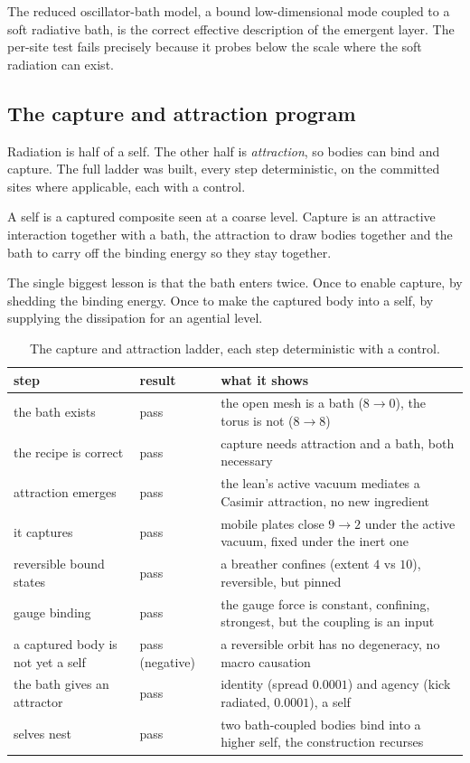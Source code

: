 The reduced oscillator-bath model, a bound low-dimensional mode coupled to a soft radiative bath, is the correct
effective description of the emergent layer. The per-site test fails precisely because it probes below the scale
where the soft radiation can exist.

\subsection{The capture and attraction program}

Radiation is half of a self. The other half is \emph{attraction}, so bodies can bind and capture. The full ladder
was built, every step deterministic, on the committed sites where applicable, each with a control.

\begin{definition}[Capture]
A self is a captured composite seen at a coarse level. Capture is an attractive interaction together with a bath,
the attraction to draw bodies together and the bath to carry off the binding energy so they stay together.
\end{definition}

The single biggest lesson is that the bath enters twice. Once to enable capture, by shedding the binding energy.
Once to make the captured body into a self, by supplying the dissipation for an agential level.

\begin{table}[ht]
\centering
\begin{tabular}{@{}llp{}@{}}
\toprule
step & result & what it shows \\
\midrule
the bath exists & pass & the open mesh is a bath ($8 \to 0$), the torus is not ($8 \to 8$) \\
the recipe is correct & pass & capture needs attraction and a bath, both necessary \\
attraction emerges & pass & the lean's active vacuum mediates a Casimir attraction, no new ingredient \\
it captures & pass & mobile plates close $9 \to 2$ under the active vacuum, fixed under the inert one \\
reversible bound states & pass & a breather confines (extent $4$ vs $10$), reversible, but pinned \\
gauge binding & pass & the gauge force is constant, confining, strongest, but the coupling is an input \\
a captured body is not yet a self & pass (negative) & a reversible orbit has no degeneracy, no macro causation \\
the bath gives an attractor & pass & identity (spread $0.0001$) and agency (kick radiated, $0.0001$), a self \\
selves nest & pass & two bath-coupled bodies bind into a higher self, the construction recurses \\
\bottomrule
\end{tabular}
\caption{The capture and attraction ladder, each step deterministic with a control.}
\label{tab:capture-ladder}
\end{table}

